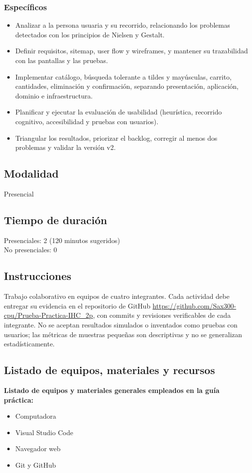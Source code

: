\documentclass{article}
\begin{document}
\subsubsection{Específicos}
\begin{itemize}
    \item Analizar a la persona usuaria y su recorrido, relacionando los problemas detectados con los principios de Nielsen y Gestalt.
    \item Definir requisitos, sitemap, user flow y wireframes, y mantener su trazabilidad con las pantallas y las pruebas.
    \item Implementar catálogo, búsqueda tolerante a tildes y mayúsculas, carrito, cantidades, eliminación y confirmación, separando presentación, aplicación, dominio e infraestructura.
    \item Planificar y ejecutar la evaluación de usabilidad (heurística, recorrido cognitivo, accesibilidad y pruebas con usuarios).
    \item Triangular los resultados, priorizar el backlog, corregir al menos dos problemas y validar la versión v2.
\end{itemize}

\subsection{Modalidad}
Presencial

\subsection{Tiempo de duración}
Presenciales: 2 (120 minutos sugeridos)\\
No presenciales: 0

\subsection{Instrucciones}
Trabajo colaborativo en equipos de cuatro integrantes. Cada actividad debe entregar su evidencia en el repositorio de GitHub \url{https://github.com/Sax300-cpu/Prueba-Practica-IHC_2p}, con commits y revisiones verificables de cada integrante. No se aceptan resultados simulados o inventados como pruebas con usuarios; las métricas de muestras pequeñas son descriptivas y no se generalizan estadísticamente.

\subsection{Listado de equipos, materiales y recursos}
\textbf{Listado de equipos y materiales generales empleados en la guía práctica:}
\begin{itemize}
    \item Computadora
    \item Visual Studio Code
    \item Navegador web
    \item Git y GitHub
\end{itemize}
\end{document}
